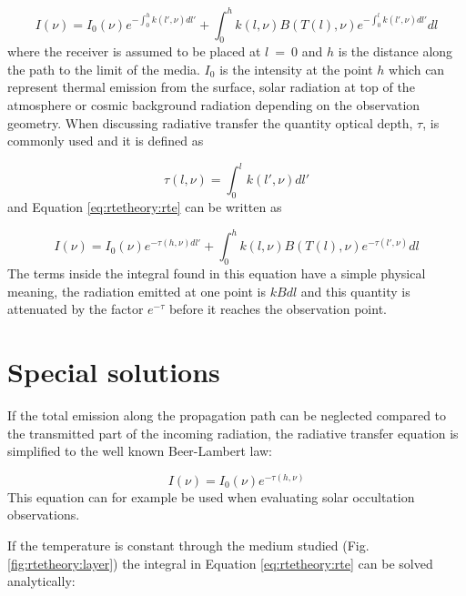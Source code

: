  \begin{equation}
   I(\nu) = I_0(\nu)e^{-\int^h_0{k(l',\nu)dl'}} + 
     \int^h_0{k(l,\nu)B(T(l),\nu) e^{-\int^l_0{k(l',\nu)dl'}} dl}
  \label{eq:rtetheory:rte}
 \end{equation}  
 where the receiver is assumed to be placed at $l$~=~0 and $h$ is the
 distance along the path to the limit of the media. $I_0$ is the
 intensity at the point $h$ which can represent thermal emission from
 the surface, solar radiation at top of the atmosphere or cosmic
 background radiation depending on the observation geometry. When
 discussing radiative transfer the quantity optical depth, $\tau$, is
 commonly used and it is defined as

 \begin{equation}
   \tau(l,\nu) = \int^l_0{k(l',\nu)dl'} 
  \label{eq:rtetheory:tau}
 \end{equation}  
 and Equation \ref{eq:rtetheory:rte} can be written as
 
 \begin{equation}
   I(\nu) = I_0(\nu)e^{-\tau(h,\nu)dl'} + 
     \int^h_0{k(l,\nu)B(T(l),\nu) e^{-\tau(l',\nu)} dl}
  \label{eq:rtetheory:rte2}
 \end{equation}  
 The terms inside the integral found in this equation have a simple
 physical meaning, the radiation emitted at one point is $kBdl$ and this
 quantity is attenuated by the factor $e^{-\tau}$ before it reaches the
 observation point.


\section{Special solutions}
 \label{sec:rtetheory:special}
 
 If the total emission along the propagation path can be neglected
 compared to the transmitted part of the incoming radiation, the
 radiative transfer equation is simplified to the well known Beer-Lambert law:
 
 \begin{equation}
   I(\nu) = I_0(\nu)e^{-\tau(h,\nu)}
  \label{eq:rtetheory:beer}
 \end{equation}  
 This equation can for example be used when evaluating solar
 occultation observations.  
 
 If the temperature is constant through the medium studied (Fig.
 \ref{fig:rtetheory:layer}) the integral in Equation \ref{eq:rtetheory:rte} can be solved
 analytically:

